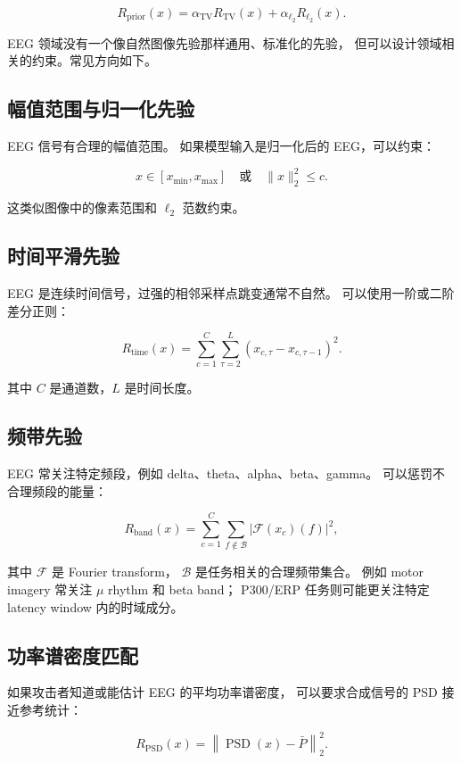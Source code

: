 \documentclass[11pt]{article}
\begin{document}
\[
R_{\mathrm{prior}}(x)
=
\alpha_{\mathrm{TV}}R_{\mathrm{TV}}(x)
+
\alpha_{\ell_2}R_{\ell_2}(x).
\]

EEG 领域没有一个像自然图像先验那样通用、标准化的先验，
但可以设计领域相关的约束。常见方向如下。

\subsection{幅值范围与归一化先验}

EEG 信号有合理的幅值范围。
如果模型输入是归一化后的 EEG，可以约束：

\[
x \in [x_{\min},x_{\max}]
\quad
\text{或}
\quad
\|x\|_2^2 \leq c.
\]

这类似图像中的像素范围和 \(\ell_2\) 范数约束。

\subsection{时间平滑先验}

EEG 是连续时间信号，过强的相邻采样点跳变通常不自然。
可以使用一阶或二阶差分正则：

\[
R_{\mathrm{time}}(x)
=
\sum_{c=1}^{C}
\sum_{\tau=2}^{L}
\left(
x_{c,\tau}-x_{c,\tau-1}
\right)^2.
\]

其中 \(C\) 是通道数，\(L\) 是时间长度。

\subsection{频带先验}

EEG 常关注特定频段，例如 delta、theta、alpha、beta、gamma。
可以惩罚不合理频段的能量：

\[
R_{\mathrm{band}}(x)
=
\sum_{c=1}^{C}
\sum_{f\notin\mathcal{B}}
\left|
\mathcal{F}(x_c)(f)
\right|^2,
\]

其中 \(\mathcal{F}\) 是 Fourier transform，
\(\mathcal{B}\) 是任务相关的合理频带集合。
例如 motor imagery 常关注 \(\mu\) rhythm 和 beta band；
P300/ERP 任务则可能更关注特定 latency window 内的时域成分。

\subsection{功率谱密度匹配}

如果攻击者知道或能估计 EEG 的平均功率谱密度，
可以要求合成信号的 PSD 接近参考统计：

\[
R_{\mathrm{PSD}}(x)
=
\left\|
\operatorname{PSD}(x)
-
\bar{P}
\right\|_2^2.
\]
\end{document}
